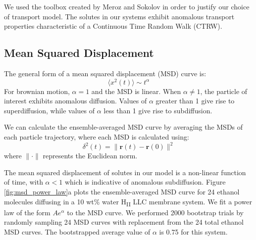 \documentclass{article}
\begin{document}
  We used the toolbox created by Meroz and Sokolov in order to justify our
  choice of transport model.\cite{meroz_toolbox_2015} The solutes in our systems
  exhibit anomalous transport properties characteristic of a Continuous Time
  Random Walk (CTRW). 

  \subsection*{Mean Squared Displacement}

  The general form of a mean squared displacement (MSD) curve is:
  \begin{equation}
	\langle x^2(t) \rangle \sim t ^ \alpha
	\label{eqn:msd}
  \end{equation}
  For brownian motion, $\alpha = 1$ and the MSD is linear. When $\alpha \neq
  1$, the particle of interest exhibits anomalous diffusion. Values of $\alpha$
  greater than 1 give rise to superdiffusion, while values of $\alpha$ less than
  1 give rise to subdiffusion.

  We can calculate the ensemble-averaged MSD curve by averaging the MSDs of
  each particle trajectory, where each MSD is calculated using:
  \begin{equation}
	\delta^2(t) = \| \mathbf{r}(t) - \mathbf{r}(0) \|^2
	\label{eqn:ensemble_msd}
  \end{equation}
  where $\|\cdot\|$ represents the Euclidean norm. 

  The mean squared displacement of solutes in our model is a non-linear
  function of time, with $\alpha < 1$ which is indicative of anomalous
  subdiffusion. Figure \ref{fig:msd_power_law}a plots the ensemble-averaged MSD
  curve for 24 ethanol molecules diffusing in a 10 wt\% water H\textsubscript{II}
  LLC membrane system. We fit a power law of the form $Ae^{\alpha}$ to the MSD
  curve. We performed 2000 bootstrap trials by randomly sampling 24 MSD curves
  with replacement from the 24 total ethanol MSD curves. The bootstrapped average
  value of $\alpha$ is 0.75 for this system. 
 
\end{document}
